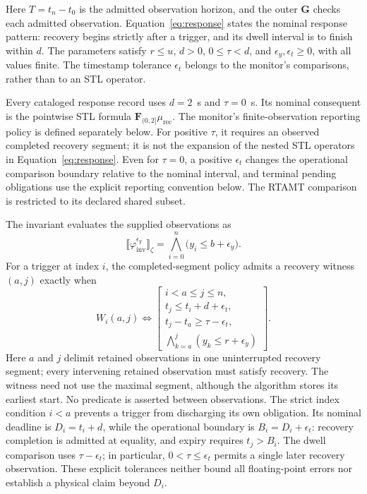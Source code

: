 Here $T=t_n-t_0$ is the admitted observation horizon, and the outer $\mathbf{G}$ checks each admitted observation. Equation~\eqref{eq:response} states the nominal response pattern: recovery begins strictly after a trigger, and its dwell interval is to finish within $d$. The parameters satisfy $r\leq u$, $d>0$, $0\leq\tau<d$, and $\epsilon_y,\epsilon_t\geq0$, with all values finite. The timestamp tolerance $\epsilon_t$ belongs to the monitor's comparisons, rather than to an STL operator.

Every cataloged response record uses $d=2$~s and $\tau=0$~s. Its nominal consequent is the pointwise STL formula $\mathbf{F}_{(0,2]}\mu_{\mathrm{rec}}$. The monitor's finite-observation reporting policy is defined separately below. For positive $\tau$, it requires an observed completed recovery segment; it is not the expansion of the nested STL operators in Equation~\eqref{eq:response}. Even for $\tau=0$, a positive $\epsilon_t$ changes the operational comparison boundary relative to the nominal interval, and terminal pending obligations use the explicit reporting convention below. The RTAMT comparison is restricted to its declared shared subset.

The invariant evaluates the supplied observations as
\begin{equation}
\llbracket\varphi_{\mathrm{inv}}^{\epsilon_y}\rrbracket_{\zeta}
=\bigwedge_{i=0}^{n}\bigl(y_i\leq b+\epsilon_y\bigr).
\label{eq:invariant-expanded}
\end{equation}
For a trigger at index $i$, the completed-segment policy admits a recovery witness $(a,j)$ exactly when
\begin{equation}
W_i(a,j)\Longleftrightarrow
\left[
\begin{array}{l}
i<a\leq j\leq n,\\
t_j\leq t_i+d+\epsilon_t,\\
t_j-t_a\geq\tau-\epsilon_t,\\
\displaystyle\bigwedge_{k=a}^{j}(y_k\leq r+\epsilon_y)
\end{array}
\right].
\label{eq:recovery-witness}
\end{equation}
Here $a$ and $j$ delimit retained observations in one uninterrupted recovery segment; every intervening retained observation must satisfy recovery. The witness need not use the maximal segment, although the algorithm stores its earliest start. No predicate is asserted between observations. The strict index condition $i<a$ prevents a trigger from discharging its own obligation. Its nominal deadline is $D_i=t_i+d$, while the operational boundary is $B_i=D_i+\epsilon_t$: recovery completion is admitted at equality, and expiry requires $t_j>B_i$. The dwell comparison uses $\tau-\epsilon_t$; in particular, $0<\tau\leq\epsilon_t$ permits a single later recovery observation. These explicit tolerances neither bound all floating-point errors nor establish a physical claim beyond $D_i$.

